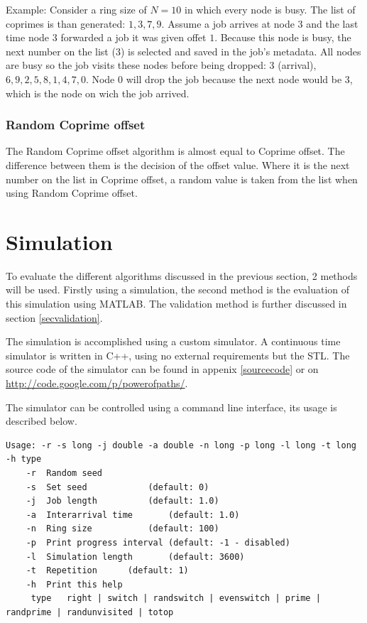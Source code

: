 \documentclass[10pt,a4paper]{article}
\begin{document}
Example:
Consider a ring size of $N=10$ in which every node is busy. The list of coprimes is than generated: ${1, 3, 7, 9}$. Assume a job arrives at node $3$ and the last time node $3$ forwarded a job it was given offet $1$.
Because this node is busy, the next number on the list ($3$) is selected and saved in the job's metadata. All nodes are busy so the job visits these nodes before being dropped: $3$ (arrival), $6, 9, 2, 5, 8, 1, 4, 7, 0$. Node $0$ will drop the job because the next node would be $3$, which is the node on wich the job arrived.

\subsubsection{Random Coprime offset}
The Random Coprime offset algorithm is almost equal to Coprime offset. The difference between them is the decision of the offset value. Where it is the next number on the list in Coprime offset, a random value is taken from the list when using Random Coprime offset.

\section{Simulation}
\label{secsimulation}
To evaluate the different algorithms discussed in the previous section, 2 methods will be used. Firstly using a simulation, the second method is the evaluation of this simulation using MATLAB. The validation method is further discussed in section \ref{secvalidation}.

The simulation is accomplished using a custom simulator. A continuous time simulator is written in C++, using no external requirements but the STL. The source code of the simulator can be found in appenix \ref{sourcecode} or on \url{http://code.google.com/p/powerofpaths/}.

The simulator can be controlled using a command line interface, its usage is described below.

\begin{lstlisting}
Usage: -r -s long -j double -a double -n long -p long -l long -t long -h type
	-r	Random seed
	-s	Set seed			(default: 0)
	-j	Job length			(default: 1.0)
	-a	Interarrival time		(default: 1.0)
	-n	Ring size			(default: 100)
	-p	Print progress interval	(default: -1 - disabled)
	-l	Simulation length		(default: 3600)
	-t	Repetition		(default: 1)
	-h	Print this help
	 type	right | switch | randswitch | evenswitch | prime | randprime | randunvisited | totop
\end{lstlisting}
\end{document}
